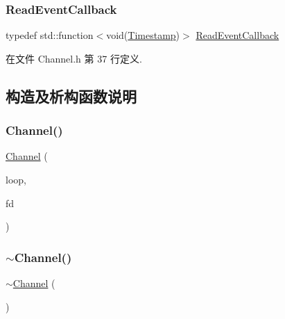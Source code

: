 \subsubsection{\texorpdfstring{Read\+Event\+Callback}{ReadEventCallback}}
{\footnotesize\ttfamily typedef std\+::function$<$void(\hyperlink{classmuduo_1_1Timestamp}{Timestamp})$>$ \hyperlink{classmuduo_1_1net_1_1Channel_ae78e1c2582cc5d60cd1a4506851e8991}{Read\+Event\+Callback}}



在文件 Channel.\+h 第 37 行定义.



\subsection{构造及析构函数说明}
\mbox{\label{classmuduo_1_1net_1_1Channel_a51d49371e765dcf30535b38b68bb80b6}} 
\subsubsection{\texorpdfstring{Channel()}{Channel()}}
{\footnotesize\ttfamily \hyperlink{classmuduo_1_1net_1_1Channel}{Channel} (\begin{DoxyParamCaption}\item[{\hyperlink{classmuduo_1_1net_1_1EventLoop}{Event\+Loop} $\ast$}]{loop,  }\item[{int}]{fd }\end{DoxyParamCaption})}

\mbox{\label{classmuduo_1_1net_1_1Channel_aad279ec58dddf879ac20651fceffd4cf}} 
\subsubsection{\texorpdfstring{$\sim$\+Channel()}{~Channel()}}
{\footnotesize\ttfamily $\sim$\hyperlink{classmuduo_1_1net_1_1Channel}{Channel} (\begin{DoxyParamCaption}{ }\end{DoxyParamCaption})}



